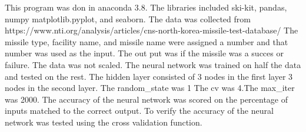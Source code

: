 This program was don in anaconda 3.8. The libraries included ski-kit, pandas, numpy
matplotlib.pyplot, and seaborn. The data was collected from https://www.nti.org/analysis/articles/cns-north-korea-missile-test-database/
The missile type, facility name, and missile name were assigned a number and that number was used as the input. 
The out put was if the missile was a succes or failure. The data was not scaled. The neural network was trained on half the data and tested 
on the rest. The hidden layer consisted of 3 nodes in the first layer 3 nodes in the second layer. The random_state was 1
The cv was 4.The max_iter was 2000. The accuracy of the neural network was scored on the percentage of inputs matched to the correct output.
To verify the accuracy of the neural network was tested using the cross validation function.
